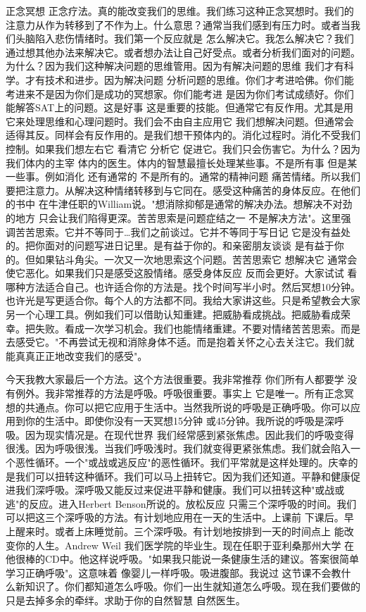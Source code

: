 正念冥想 正念疗法。真的能改变我们的思维。我们练习这种正念冥想时。我们的注意力从作为转移到了不作为上。什么意思？通常当我们感到有压力时。或者当我们头脑陷入悲伤情绪时。我们第一个反应就是 怎么解决它。我怎么解决它？我们通过想其他办法来解决它。或者想办法让自己好受点。或者分析我们面对的问题。为什么？因为我们这种解决问题的思维管用。因为有解决问题的思维 我们才有科学。才有技术和进步。因为解决问题 分析问题的思维。你们才考进哈佛。你们能考进来不是因为你们是成功的冥想家。你们能考进 是因为你们考试成绩好。你们能解答SAT上的问题。这是好事 这是重要的技能。但通常它有反作用。尤其是用它来处理思维和心理问题时。我们会不由自主应用它 我们想解决问题。但通常会适得其反。同样会有反作用的。是我们想干预体内的。消化过程时。消化不受我们控制。如果我们想左右它 看清它 分析它 促进它。我们只会伤害它。为什么？因为我们体内的主宰 体内的医生。体内的智慧最擅长处理某些事。不是所有事 但是某一些事。例如消化 还有通常的 不是所有的。通常的精神问题 痛苦情绪。所以我们要把注意力。从解决这种情绪转移到与它同在。感受这种痛苦的身体反应。在他们的书中 在牛津任职的William说。"想消除抑郁是通常的解决办法。想解决不对劲的地方 只会让我们陷得更深。苦苦思索是问题症结之一 不是解决方法"。这里强调苦苦思索。它并不等同于…我们之前谈过。它并不等同于写日记 它是没有益处的。把你面对的问题写进日记里。是有益于你的。和亲密朋友谈谈 是有益于你的。但如果钻斗角尖。一次又一次地思索这个问题。苦苦思索它 想解决它 通常会使它恶化。如果我们只是感受这股情绪。感受身体反应 反而会更好。大家试试 看哪种方法适合自己。也许适合你的方法是。找个时间写半小时。然后冥想10分钟。也许光是写更适合你。每个人的方法都不同。我给大家讲这些。只是希望教会大家另一个心理工具。例如我们可以借助认知重建。把威胁看成挑战。把威胁看成荣幸。把失败。看成一次学习机会。我们也能情绪重建。不要对情绪苦苦思索。而是去感受它。"不再尝试无视和消除身体不适。而是抱着关怀之心去关注它。我们就能真真正正地改变我们的感受"。 

今天我教大家最后一个方法。这个方法很重要。我非常推荐 你们所有人都要学 没有例外。我非常推荐的方法是呼吸。呼吸很重要。事实上 它是唯一。所有正念冥想的共通点。你可以把它应用于生活中。当然我所说的呼吸是正确呼吸。你可以应用到你的生活中。即使你没有一天冥想15分钟 或45分钟。我所说的呼吸是深呼吸。因为现实情况是。在现代世界 我们经常感到紧张焦虑。因此我们的呼吸变得很浅。因为呼吸很浅。当我们呼吸浅时。我们就变得更紧张焦虑。我们就会陷入一个恶性循环。一个"或战或逃反应"的恶性循环。我们平常就是这样处理的。庆幸的是我们可以扭转这种循环。我们可以马上扭转它。因为我们还知道。平静和健康促进我们深呼吸。深呼吸又能反过来促进平静和健康。我们可以扭转这种"或战或逃"的反应。进入Herbert Benson所说的。放松反应 只需三个深呼吸的时间。我们可以把这三个深呼吸的方法。有计划地应用在一天的生活中。上课前 下课后。早上醒来时。或者上床睡觉前。三个深呼吸。有计划地按排到一天的时间点上 能改变你的人生。Andrew Weil 我们医学院的毕业生。现在任职于亚利桑那州大学 在他很棒的CD中。他这样说呼吸。"如果我只能说一条健康生活的建议。答案很简单 学习正确呼吸"。这意味着 像婴儿一样呼吸。吸进腹部。我说过 这节课不会教什么新知识了。你们都知道怎么呼吸。你们一出生就知道怎么呼吸。现在我们要做的只是去掉多余的牵绊。求助于你的自然智慧 自然医生。 

